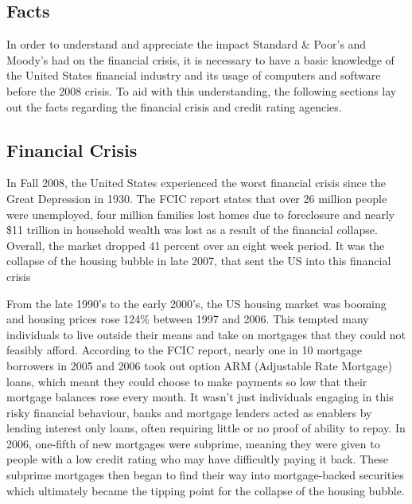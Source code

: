 \documentclass[11pt]{article}
\begin{document}
\newpage


\begin{multicols}{2}
\setcounter{page}{1}
\section{Facts}
In order to understand and appreciate the impact Standard \& Poor's and Moody's had on the financial crisis, it is necessary to have a basic knowledge of the United States financial industry and its usage of computers and software before the 2008 crisis.  To aid with this understanding, the following sections lay out the facts regarding the financial crisis and credit rating agencies.


\subsection{Financial Crisis}
In Fall 2008, the United States experienced the worst financial crisis since the Great Depression in 1930.  The FCIC report states that over 26 million people were unemployed, four million families lost homes due to foreclosure and nearly \$11 trillion in household wealth was lost as a result of the financial collapse.  \cite[p.~xv]{govtReport}  Overall, the market dropped 41 percent over an eight week period. \cite{marketWatch}  It was the collapse of the housing bubble in late 2007, that sent the US into this financial crisis


From the late 1990's to the early 2000's, the US housing market was booming and housing prices rose 124\% between 1997 and 2006. \cite{economistCreditCrunch}  This tempted many individuals to live outside their means and take on mortgages that they could not feasibly afford.  According to the FCIC report, nearly one in 10 mortgage borrowers in 2005 and 2006 took out option ARM (Adjustable Rate Mortgage) loans, which meant they could choose to make payments so low that their mortgage balances rose every month. \cite[p.~xx]{govtReport} It wasn't just individuals engaging in this risky financial behaviour, banks and mortgage lenders acted as enablers by lending interest only loans, often requiring little or no proof of ability to repay. \cite[p.~xxiii]{govtReport}  In 2006, one-fifth of new mortgages were subprime, meaning they were given to people with a low credit rating who may have difficultly paying it back. \cite{economistCreditCrunch}  These subprime mortgages then began to find their way into mortgage-backed securities which ultimately became the tipping point for the collapse of the housing bubble.



\end{multicols}
\end{document}
